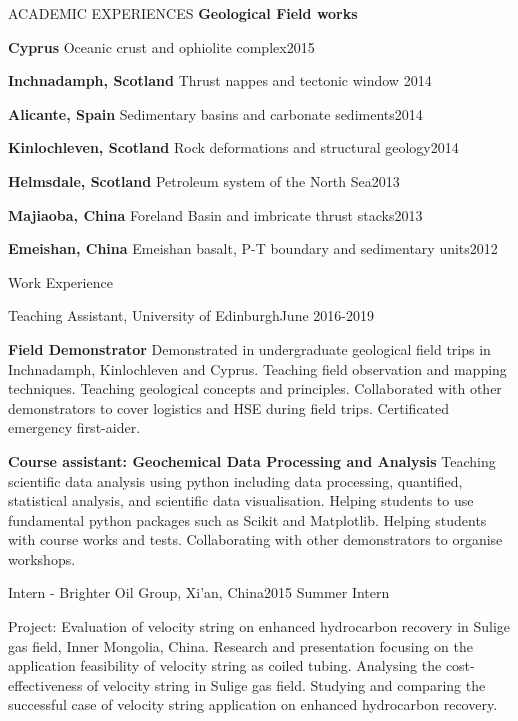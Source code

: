 \documentclass{resume} %
\newenvironment{indentpar}[1]%
  {\begin{list}{}%
          {\setlength{\leftmargin}{#1}}%
          \item[]%
  }
  {\end{list}}
\begin{document}
\begin{rSection}{ACADEMIC EXPERIENCES}
\textbf{Geological Field works}
\begin{indentpar}{0.5cm}
\textbf{Cyprus} Oceanic crust and ophiolite complex\hfill{2015}

\textbf{Inchnadamph, Scotland} Thrust nappes and tectonic window \hfill{2014}

\textbf{Alicante, Spain} Sedimentary basins and carbonate sediments\hfill{2014}

\textbf{Kinlochleven, Scotland} Rock deformations and structural geology\hfill{2014}

\textbf{Helmsdale, Scotland} Petroleum system of the North Sea\hfill{2013}

\textbf{Majiaoba, China} Foreland Basin and imbricate thrust stacks\hfill{2013}

\textbf{Emeishan, China} Emeishan basalt, P-T boundary and sedimentary units\hfill{2012}

\end{indentpar}
\end{rSection}
\begin{rSection}{Work Experience}
\begin{rSubsection}{Teaching Assistant, University of Edinburgh}{June 2016-2019}{}

\begin{indentpar}{0.5cm}
\textbf{Field Demonstrator} Demonstrated in undergraduate geological field trips in Inchnadamph, Kinlochleven and Cyprus. Teaching field observation and mapping techniques. Teaching geological concepts and principles. Collaborated with other demonstrators to cover logistics and HSE during field trips. Certificated emergency first-aider.

\textbf{Course assistant: Geochemical Data Processing and Analysis} Teaching scientific data analysis using python including data processing, quantified, statistical analysis, and scientific data visualisation. Helping students to use fundamental python packages such as Scikit and Matplotlib. Helping students with course works and tests. Collaborating with other demonstrators to organise workshops.
\end{indentpar}

\end{rSubsection}
\begin{rSubsection}{Intern - Brighter Oil Group, Xi'an, China}{2015 Summer Intern}{}

\begin{indentpar}{0.5cm}
Project: Evaluation of velocity string on enhanced hydrocarbon recovery in Sulige gas field, Inner Mongolia, China. Research and presentation focusing on the application feasibility of velocity string as coiled tubing. Analysing the cost-effectiveness of velocity string in Sulige gas field. Studying and comparing the successful case of velocity string application on enhanced hydrocarbon recovery.
\end{indentpar}

\end{rSubsection}
\end{rSection}
\end{document}
